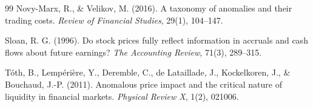 \documentclass[11pt,a4paper]{article}
\begin{document}
\begin{thebibliography}{99}
Novy-Marx, R., \& Velikov, M. (2016). A taxonomy of anomalies and their
trading costs. \emph{Review of Financial Studies}, 29(1), 104--147.

Sloan, R. G. (1996). Do stock prices fully reflect information in accruals
and cash flows about future earnings? \emph{The Accounting Review}, 71(3),
289--315.

T\'oth, B., Lemp\'eri\`ere, Y., Deremble, C., de Lataillade, J.,
Kockelkoren, J., \& Bouchaud, J.-P. (2011). Anomalous price impact and the
critical nature of liquidity in financial markets. \emph{Physical Review X},
1(2), 021006.

\end{thebibliography}
\end{document}
